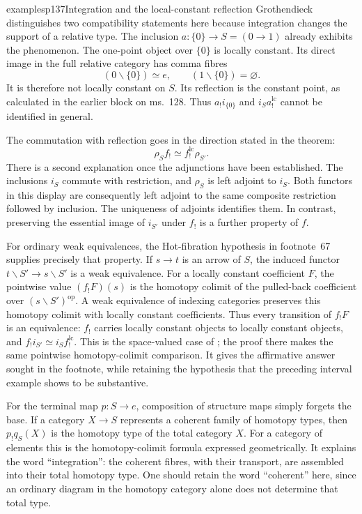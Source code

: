 \begin{dcomment}{examples}{p137}{Integration and the local-constant reflection}
Grothendieck distinguishes two compatibility statements here because integration changes the support of a relative type. The inclusion $a:\{0\}\to S=(0\to1)$ already exhibits the phenomenon. The one-point object over $\{0\}$ is locally constant. Its direct image in the full relative category has comma fibres
\[
 (0\backslash\{0\})\simeq e,
 \qquad (1\backslash\{0\})=\varnothing.
\]
It is therefore not locally constant on $S$. Its reflection is the constant point, as calculated in the earlier block on ms.~128. Thus $a_!i_{\{0\}}$ and $i_Sa_!^{\mathrm{lc}}$ cannot be identified in general.

The commutation with reflection goes in the direction stated in the theorem:
\[
 \rho_S f_!\simeq f_!^{\mathrm{lc}}\rho_{S'}.
\]
There is a second explanation once the adjunctions have been established. The inclusions $i_S$ commute with restriction, and $\rho_S$ is left adjoint to $i_S$. Both functors in this display are consequently left adjoint to the same composite restriction followed by inclusion. The uniqueness of adjoints identifies them. In contrast, preserving the essential image of $i_{S'}$ under $f_!$ is a further property of $f$.

For ordinary weak equivalences, the Hot-fibration hypothesis in footnote~67 supplies precisely that property. If $s\to t$ is an arrow of $S$, the induced functor $t\backslash S'\to s\backslash S'$ is a weak equivalence. For a locally constant coefficient $F$, the pointwise value $(f_!F)(s)$ is the homotopy colimit of the pulled-back coefficient over $(s\backslash S')^{\mathrm{op}}$. A weak equivalence of indexing categories preserves this homotopy colimit with locally constant coefficients. Thus every transition of $f_!F$ is an equivalence: $f_!$ carries locally constant objects to locally constant objects, and $f_!i_{S'}\simeq i_S f_!^{\mathrm{lc}}$. This is the space-valued case of \citet[Proposition~1.24, applied to the opposite indexing convention]{Cisinski2009LocallyConstant}; the proof there makes the same pointwise homotopy-colimit comparison. It gives the affirmative answer sought in the footnote, while retaining the hypothesis that the preceding interval example shows to be substantive.

For the terminal map $p:S\to e$, composition of structure maps simply forgets the base. If a category $X\to S$ represents a coherent family of homotopy types, then $p_!q_S(X)$ is the homotopy type of the total category $X$. For a category of elements this is the homotopy-colimit formula expressed geometrically. It explains the word ``integration'': the coherent fibres, with their transport, are assembled into their total homotopy type. One should retain the word ``coherent'' here, since an ordinary diagram in the homotopy category alone does not determine that total type.
\end{dcomment}

